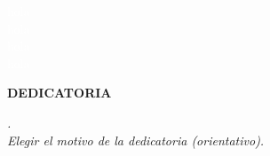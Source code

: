 \textcolor{white}{
hola \\
hola \\
hola \\
hola \\
}
\begin{flushright}
\LARGE{\textbf{DEDICATORIA}}
\end{flushright}


\begin{flushright}
\textit{. \\
Elegir el motivo de la dedicatoria (orientativo).}
\end{flushright}

